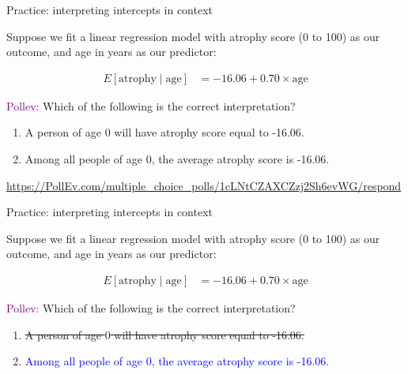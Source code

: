 \documentclass[10pt,t]{beamer}
\begin{document}
\begin{frame}{Practice: interpreting intercepts in context}

Suppose we fit a linear regression model with atrophy score (0 to 100) as our outcome, and age in years as our predictor:

\begin{align*}
E[\text{atrophy} \mid \text{age}] & = -16.06 + 0.70 \times \text{age}
\end{align*}

\textcolor{purple}{Pollev:} Which of the following is the correct interpretation?
\medskip

\begin{enumerate}
	\item A person of age $0$ will have atrophy score equal to -16.06.
	\item Among all people of age $0$, the average atrophy score is -16.06.
\end{enumerate}

\medskip
\url{https://PollEv.com/multiple_choice_polls/1cLNtCZAXCZzj2Sh6evWG/respond}
\end{frame}

\begin{frame}{Practice: interpreting intercepts in context}
	
	Suppose we fit a linear regression model with atrophy score (0 to 100) as our outcome, and age in years as our predictor:
	
	\begin{align*}
	E[\text{atrophy} \mid \text{age}] & = -16.06 + 0.70 \times \text{age}
	\end{align*}
	
	\textcolor{purple}{Pollev:} Which of the following is the correct interpretation?
	\medskip
	
	\begin{enumerate}
		\item \sout{A person of age $0$ will have atrophy score equal to -16.06.}
		\item \textcolor{blue}{Among all people of age $0$, the average atrophy score is -16.06.}
	\end{enumerate}
\end{frame}
\end{document}

